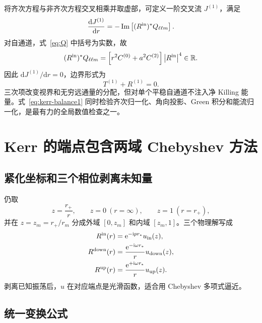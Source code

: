 \documentclass[UTF8,fontset=fandol,11pt,a4paper]{ctexart}
\newcommand{\dd}{\mathrm d}
\newcommand{\ii}{\mathrm i}
\newcommand{\ee}{\mathrm e}
\newcommand{\abs}[1]{\left|#1\right|}
\newcommand{\Imm}{\operatorname{Im}}
\begin{document}
将齐次方程与非齐次方程交叉相乘并取虚部，可定义一阶交叉流 $J^{(1)}$，满足
\begin{equation}
\frac{\dd J^{(1)}}{\dd r}
=-\Imm\left[(R^{\rm in})^*Q_{\ell\ell m}\right].
\label{eq:cross-current}
\end{equation}
对自通道，式~\eqref{eq:Q} 中括号为实数，故
\begin{equation}
(R^{\rm in})^*Q_{\ell\ell m}
=\left[r^2C^{(0)}+a^2C^{(2)}\right]\abs{R^{\rm in}}^4
\in\mathbb R.
\end{equation}
因此 $\dd J^{(1)}/\dd r=0$，边界形式为
\begin{equation}
\boxed{T^{(1)}+R^{(1)}=0.}
\label{eq:kerr-balance1}
\end{equation}
三次项改变视界和无穷远通量的分配，但对单个平稳自通道不注入净 Killing 能量。式~\eqref{eq:kerr-balance1} 同时检验齐次归一化、角向投影、Green 积分和能流归一化，是最有力的全局数值检查之一。

\section{Kerr 的端点包含两域 Chebyshev 方法}
\label{sec:kerr-spectral}

\subsection{紧化坐标和三个相位剥离未知量}

仍取
\begin{equation}
z=\frac{r_+}{r},\qquad z=0\ (r=\infty),\qquad z=1\ (r=r_+),
\label{eq:kerr-z}
\end{equation}
并在 $z=z_m=r_+/r_m$ 分成外域 $[0,z_m]$ 和内域 $[z_m,1]$。三个物理解写成
\begin{align}
R^{\rm in}(r)&=\ee^{-\ii p r_*}u_{\rm in}(z),\\
R^{\rm down}(r)&=\frac{\ee^{-\ii\omega r_*}}{r}u_{\rm down}(z),\\
R^{\rm up}(r)&=\frac{\ee^{+\ii\omega r_*}}{r}u_{\rm up}(z).
\label{eq:kerr-peeling}
\end{align}
剥离已知振荡后，$u$ 在对应端点是光滑函数，适合用 Chebyshev 多项式逼近。

\subsection{统一变换公式}
\end{document}
